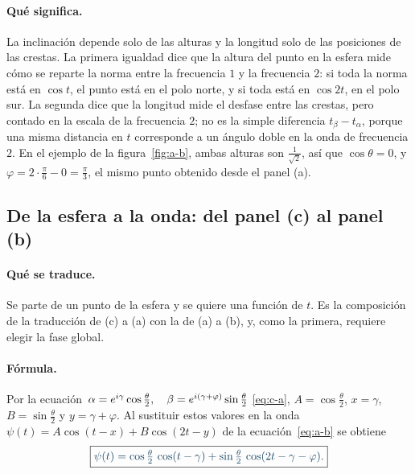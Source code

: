 \paragraph{Qué significa.}
La inclinación depende solo de las alturas y la longitud solo de las posiciones de las crestas.
La primera igualdad dice que la altura del punto en la esfera mide cómo se reparte la norma entre
la frecuencia $1$ y la frecuencia $2$: si toda la norma está en $\cos t$, el punto está en el
polo norte, y si toda está en $\cos 2t$, en el polo sur. La segunda dice que la longitud mide el
desfase entre las crestas, pero contado en la escala de la frecuencia $2$; no es la simple
diferencia $t_\beta-t_\alpha$, porque una misma distancia en $t$ corresponde a un ángulo doble en
la onda de frecuencia $2$. En el ejemplo de la figura~\ref{fig:a-b}, ambas alturas son
$\frac1{\sqrt2}$, así que $\cos\theta=0$, y $\varphi=2\cdot\frac\pi6-0=\frac\pi3$, el mismo punto
obtenido desde el panel (a).

\subsection*{De la esfera a la onda: del panel (c) al panel (b)}

\paragraph{Qué se traduce.}
Se parte de un punto de la esfera y se quiere una función de $t$. Es la composición de la
traducción de (c) a (a) con la de (a) a (b), y, como la primera, requiere elegir la fase
global.

\paragraph{Fórmula.}
Por la ecuación~$\alpha=e^{i\gamma}\cos\tfrac\theta2,\quad\penalty0 \beta=e^{i(\gamma+\varphi)}\sin\tfrac\theta2$ \eqref{eq:c-a}, $A=\cos\frac\theta2$, $x=\gamma$, $B=\sin\frac\theta2$ y
$y=\gamma+\varphi$. Al sustituir estos valores en la onda $\psi(t)=A\cos(t-x)+B\cos(2t-y)$ de la ecuación~\eqref{eq:a-b} se obtiene
\begin{equation}\label{eq:c-b}
  \destacado{\psi(t)=\cos\tfrac\theta2\,\cos(t-\gamma)
  +\sin\tfrac\theta2\,\cos(2t-\gamma-\varphi).}
\end{equation}

